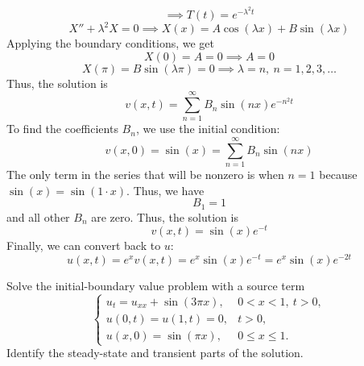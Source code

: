 \documentclass[12pt]{article}
\begin{document}
\[
\implies T(t) = e^{-\lambda^2 t}
\]
\[
X'' + \lambda^2 X = 0
\implies X(x) = A \cos(\lambda x) + B \sin(\lambda x)
\]
Applying the boundary conditions, we get
\[
X(0) = A = 0 \implies A = 0
\]
\[
X(\pi) = B \sin(\lambda \pi) = 0 \implies \lambda = n, \ n = 1,2,3,\dots
\]
Thus, the solution is
\[
v(x,t) = \sum_{n=1}^\infty B_n \sin(nx) e^{-n^2 t}
\]
To find the coefficients $B_n$, we use the initial condition:
\[
v(x,0) = \sin(x) = \sum_{n=1}^\infty B_n \sin(nx)
\]
The only term in the series that will be nonzero is when $n=1$ because $\sin(x) = \sin(1 \cdot x)$. Thus, we have
\[
B_1 = 1
\]
and all other $B_n$ are zero. Thus, the solution is
\[
v(x,t) = \sin(x) e^{-t}
\]
Finally, we can convert back to $u$:
\[
\boxed{
u(x,t) = e^x v(x,t) = e^x \sin(x) e^{-t} = e^x \sin(x) e^{-2t}
}
\]


Solve the initial-boundary value problem with a source term
\[
\begin{cases}
u_t = u_{xx} + \sin(3\pi x), & 0 < x < 1,\ t > 0, \\
u(0,t) = u(1,t) = 0, & t > 0, \\
u(x,0) = \sin(\pi x), & 0 \leq x \leq 1.
\end{cases}
\]
Identify the steady-state and transient parts of the solution.
\end{document}
